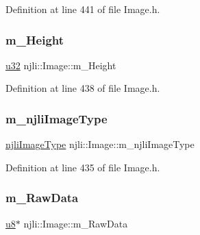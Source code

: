 Definition at line 441 of file Image.\+h.

\mbox{\label{classnjli_1_1_image_ac4709639cbda0dab2a74ffd6a7466026}} 
\subsubsection{\texorpdfstring{m\+\_\+\+Height}{m\_Height}}
{\footnotesize\ttfamily \mbox{\hyperlink{_util_8h_a10e94b422ef0c20dcdec20d31a1f5049}{u32}} njli\+::\+Image\+::m\+\_\+\+Height\hspace{0.3cm}{\ttfamily [private]}}



Definition at line 438 of file Image.\+h.

\mbox{\label{classnjli_1_1_image_ae4ede32142eb6433f3db385a0e7bdd80}} 
\subsubsection{\texorpdfstring{m\+\_\+njli\+Image\+Type}{m\_njliImageType}}
{\footnotesize\ttfamily \mbox{\hyperlink{namespacenjli_a709a24b63b768ce1cdff54f7f48d3c0b}{njli\+Image\+Type}} njli\+::\+Image\+::m\+\_\+njli\+Image\+Type\hspace{0.3cm}{\ttfamily [private]}}



Definition at line 435 of file Image.\+h.

\mbox{\label{classnjli_1_1_image_a15158bdf19f840193dca9df44bf9e348}} 
\subsubsection{\texorpdfstring{m\+\_\+\+Raw\+Data}{m\_RawData}}
{\footnotesize\ttfamily \mbox{\hyperlink{_util_8h_aed742c436da53c1080638ce6ef7d13de}{u8}}$\ast$ njli\+::\+Image\+::m\+\_\+\+Raw\+Data\hspace{0.3cm}{\ttfamily [private]}}



